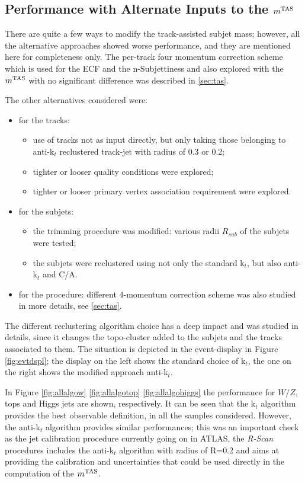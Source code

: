 \subsection{Performance with Alternate Inputs to the $m^\textrm{TAS}$}
\label{sec:alternate}

There are quite a few ways to modify the track-assisted subjet mass; however, all the alternative approaches showed worse performance, and they are mentioned here for completeness only.
The per-track four momentum correction scheme which is used for the ECF and the n-Subjettiness and also explored with the $m^\textrm{TAS}$ with no significant difference was described in \ref{sec:tas}.

The other alternatives considered were: 
\begin{itemize}
 \item for the tracks:
 \begin{itemize}
   \item use of tracks not as input directly, but only taking those belonging to anti-k$_t$ reclustered track-jet with radius of 0.3 or 0.2;
   \item tighter or looser quality conditions were explored;
   \item tighter or looser primary vertex association requirement were explored.
 \end{itemize}
 \item for the subjets:
  \begin{itemize}
   \item the trimming procedure was modified: various radii $R_{sub}$ of the subjets were tested;
   \item the subjets were reclustered using not only the standard k$_t$, but also anti-k$_t$ and C/A.
  \end{itemize}
  \item for the procedure: different 4-momentum correction scheme was also studied in more details, see \ref{sec:tas}.
\end{itemize}

The different reclustering algorithm choice has a deep impact and was studied in details, since it changes the topo-cluster added to the subjets and the tracks associated to them. The situation is depicted in the event-display in Figure \ref{fig:evtdspl}; the display on the left shows the standard choice of k$_t$, the one on the right shows the modified approach anti-k$_t$. 

In Figure \ref{fig:allalgow} \ref{fig:allalgotop} \ref{fig:allalgohiggs} the performance for $W/Z$, tops and Higgs jets are shown, respectively. It can be seen that the k$_t$ algorithm provides the best observable definition, in all the samples considered. However, the anti-k$_t$ algorithm provides similar performances; this was an important check as the jet calibration procedure currently going on in ATLAS, the \textit{R-Scan} procedures includes the anti-k$_t$ algorithm with radius of R=0.2 and aims at providing the calibration and uncertainties that could be used directly in the computation of the $m^\textrm{TAS}$.

